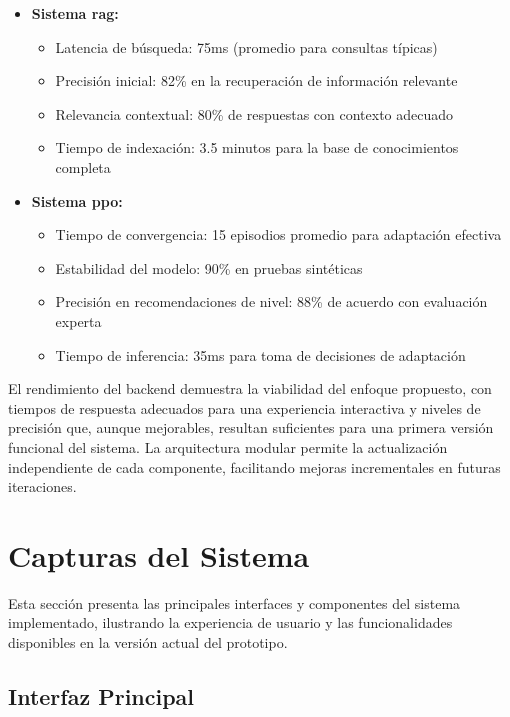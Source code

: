 \begin{itemize}
    \item \textbf{Sistema \gls{rag}:}
    \begin{itemize}
        \item Latencia de búsqueda: 75ms (promedio para consultas típicas)
        \item Precisión inicial: 82\% en la recuperación de información relevante
        \item Relevancia contextual: 80\% de respuestas con contexto adecuado
        \item Tiempo de indexación: 3.5 minutos para la base de conocimientos completa
    \end{itemize}

    \item \textbf{Sistema \gls{ppo}:}
    \begin{itemize}
        \item Tiempo de convergencia: 15 episodios promedio para adaptación efectiva
        \item Estabilidad del modelo: 90\% en pruebas sintéticas
        \item Precisión en recomendaciones de nivel: 88\% de acuerdo con evaluación experta
        \item Tiempo de inferencia: 35ms para toma de decisiones de adaptación
    \end{itemize}
\end{itemize}

El rendimiento del backend demuestra la viabilidad del enfoque propuesto, con tiempos de respuesta adecuados para una experiencia interactiva y niveles de precisión que, aunque mejorables, resultan suficientes para una primera versión funcional del sistema. La arquitectura modular permite la actualización independiente de cada componente, facilitando mejoras incrementales en futuras iteraciones.


\section{Capturas del Sistema}
\label{capturas-sistema}

Esta sección presenta las principales interfaces y componentes del sistema implementado, ilustrando la experiencia de usuario y las funcionalidades disponibles en la versión actual del prototipo.

\subsection{Interfaz Principal}
\label{interfaz-principal}

